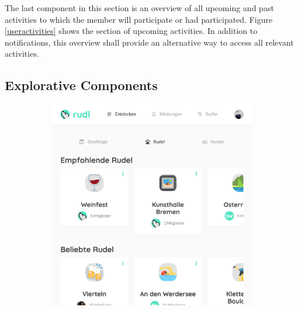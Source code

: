 \documentclass[12pt,numbers=noenddot,parskip,bibliography=totocnumbered,listof=totocnumbered,draft]{scrreprt}
\begin{document}
The last component in this section is an overview of all upcoming and past activities to which the member will participate or had participated. Figure \ref{useractivities} shows the section of upcoming activities. In addition to notifications, this overview shall provide an alternative way to access all relevant activities.

\subsection{Explorative Components}
\begin{figure}
\begin{subfigure}[t]{0.45\textwidth}%
\centering
\includegraphics[width=\linewidth]{exploreinterestgroups.png}
\caption{}
\label{exploreinterestgroups}
\end{subfigure}%
\hfill
\begin{subfigure}[t]{0.45\textwidth}%
\centering

\end{subfigure}
\end{figure}
\end{document}
